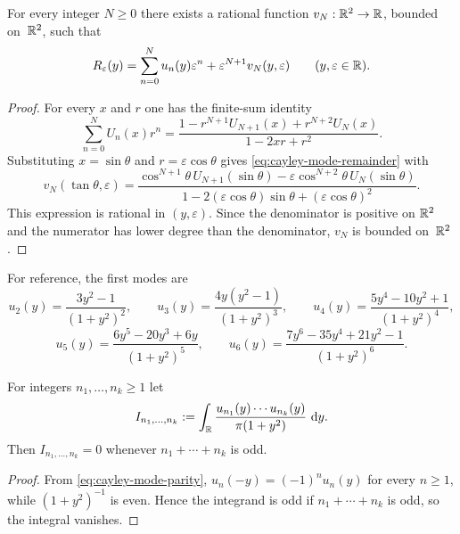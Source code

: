 \begin{proposition}%
\label{prop:cayley-mode-remainder}
For every integer $N\ge 0$ there exists a rational function
$v_N:\mathbb{R}^2\to\mathbb{R}$, bounded on~$\mathbb{R}^2$, such that
\begin{equation}\label{eq:cayley-mode-remainder}
R_\varepsilon(y)
=\sum_{n=0}^{N}u_n(y)\varepsilon^n+\varepsilon^{N+1}v_N(y,\varepsilon)
\qquad(y,\varepsilon\in\mathbb{R}).
\end{equation}
\end{proposition}

\begin{proof}
For every $x$ and $r$ one has the finite-sum identity
\[
\sum_{n=0}^{N}U_n(x)r^n
=\frac{1-r^{N+1}U_{N+1}(x)+r^{N+2}U_N(x)}{1-2xr+r^2}.
\]
Substituting $x=\sin\theta$ and $r=\varepsilon\cos\theta$ gives
\eqref{eq:cayley-mode-remainder} with
\[
v_N(\tan\theta,\varepsilon)
=\frac{\cos^{N+1}\theta\,U_{N+1}(\sin\theta)
-\varepsilon\cos^{N+2}\theta\,U_N(\sin\theta)}
{1-2(\varepsilon\cos\theta)\sin\theta+(\varepsilon\cos\theta)^2}.
\]
This expression is rational in $(y,\varepsilon)$.  Since the denominator
is positive on $\mathbb{R}^2$ and the numerator has lower degree than the
denominator, $v_N$ is bounded on~$\mathbb{R}^2$.
\end{proof}

For reference, the first modes are
\begin{equation}\label{eq:cayley-first-modes}
u_2(y)=\frac{3y^2-1}{(1+y^2)^2},
\qquad
u_3(y)=\frac{4y(y^2-1)}{(1+y^2)^3},
\qquad
u_4(y)=\frac{5y^4-10y^2+1}{(1+y^2)^4},
\end{equation}
\begin{equation}\label{eq:cayley-next-modes}
u_5(y)=\frac{6y^5-20y^3+6y}{(1+y^2)^5},
\qquad
u_6(y)=\frac{7y^6-35y^4+21y^2-1}{(1+y^2)^6}.
\end{equation}

\begin{lemma}\label{lem:mode-parity-vanish}
For integers $n_1,\dots,n_k\ge 1$ let
\[
I_{n_1,\dots,n_k}:=
\int_{\mathbb{R}}
\frac{u_{n_1}(y)\cdots u_{n_k}(y)}{\pi(1+y^2)}\,\,\mathrm{d} y.
\]
Then $I_{n_1,\dots,n_k}=0$ whenever $n_1+\cdots+n_k$ is odd.
\end{lemma}

\begin{proof}
From \eqref{eq:cayley-mode-parity}, $u_n(-y)=(-1)^n u_n(y)$ for every
$n\ge1$, while $(1+y^2)^{-1}$ is even.  Hence the integrand is odd if
$n_1+\cdots+n_k$ is odd, so the integral vanishes.
\end{proof}

